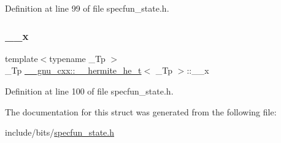 Definition at line 99 of file specfun\+\_\+state.\+h.

\mbox{\label{struct____gnu__cxx_1_1____hermite__he__t_a24b66f5153ce3e231976e18b4eccb2a0}} 
\subsubsection{\texorpdfstring{\+\_\+\+\_\+x}{\_\_x}}
{\footnotesize\ttfamily template$<$typename \+\_\+\+Tp $>$ \\
\+\_\+\+Tp \hyperlink{struct____gnu__cxx_1_1____hermite__he__t}{\+\_\+\+\_\+gnu\+\_\+cxx\+::\+\_\+\+\_\+hermite\+\_\+he\+\_\+t}$<$ \+\_\+\+Tp $>$\+::\+\_\+\+\_\+x}



Definition at line 100 of file specfun\+\_\+state.\+h.



The documentation for this struct was generated from the following file\+:\begin{DoxyCompactItemize}
\item 
include/bits/\hyperlink{specfun__state_8h}{specfun\+\_\+state.\+h}\end{DoxyCompactItemize}
